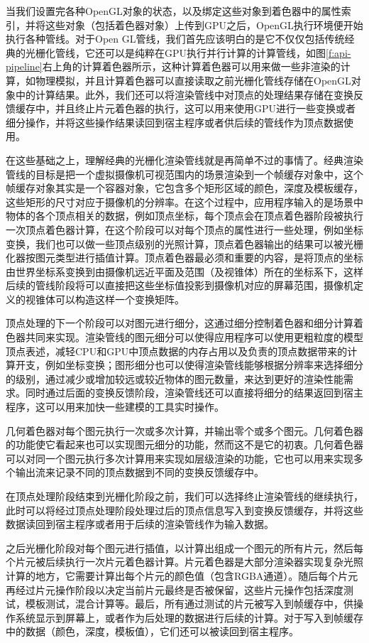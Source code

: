 当我们设置完各种OpenGL对象的状态，以及绑定这些对象到着色器中的属性索引，并将这些对象（包括着色器对象）上传到GPU之后，OpenGL执行环境便开始执行各种管线。对于Open GL管线，我们首先应该明白的是它不仅仅包括传统经典的光栅化管线，它还可以是纯粹在GPU执行并行计算的计算管线，如图\ref{f:api-pipeline}右上角的计算着色器所示，这种计算着色器可以用来做一些非渲染的计算，如物理模拟，并且计算着色器可以直接读取之前光栅化管线存储在OpenGL对象中的计算结果。此外，我们还可以将渲染管线中对顶点的处理结果存储在变换反馈缓存中，并且终止片元着色器的执行，这可以用来使用GPU进行一些变换或者细分操作，并将这些操作结果读回到宿主程序或者供后续的管线作为顶点数据使用。

在这些基础之上，理解经典的光栅化渲染管线就是再简单不过的事情了。经典渲染管线的目标是把一个虚拟摄像机可视范围内的场景渲染到一个帧缓存对象中，这个帧缓存对象其实是一个容器对象，它包含多个矩形区域的颜色，深度及模板缓存，这些矩形的尺寸对应于摄像机的分辨率。在这个过程中，应用程序输入的是场景中物体的各个顶点相关的数据，例如顶点坐标，每个顶点会在顶点着色器阶段被执行一次顶点着色器计算，在这个阶段可以对每个顶点的属性进行一些处理，例如坐标变换，我们也可以做一些顶点级别的光照计算，顶点着色器输出的结果可以被光栅化器按图元类型进行插值计算。顶点着色器最必须和重要的内容，是将顶点的坐标由世界坐标系变换到由摄像机远近平面及范围（及视锥体）所在的坐标系下，这样后续的管线阶段将可以直接把这些坐标值投影到摄像机对应的屏幕范围，摄像机定义的视锥体可以构造这样一个变换矩阵。

顶点处理的下一个阶段可以对图元进行细分，这通过细分控制着色器和细分计算着色器共同来实现。渲染管线的图元细分可以使得应用程序可以使用更粗粒度的模型顶点表述，减轻CPU和GPU中顶点数据的内存占用以及负责的顶点数据带来的计算开支，例如坐标变换；图形细分也可以使得渲染管线能够根据分辨率来选择细分的级别，通过减少或增加较远或较近物体的图元数量，来达到更好的渲染性能需求。同时通过后面的变换反馈阶段，渲染管线还可以直接将细分的结果返回到宿主程序，这可以用来加快一些建模的工具实时操作。

几何着色器对每个图元执行一次或多次计算，并输出零个或多个图元。几何着色器的功能使它看起来也可以实现图元细分的功能，然而这不是它的初衷。几何着色器可以对同一个图元执行多次计算用来实现如层级渲染的功能，它也可以用来实现多个输出流来记录不同的顶点数据到不同的变换反馈缓存中。

在顶点处理阶段结束到光栅化阶段之前，我们可以选择终止渲染管线的继续执行，此时可以将经过顶点处理阶段处理过后的顶点信息写入到变换反馈缓存，并将这些数据读回到宿主程序或者用于后续的渲染管线作为输入数据。

之后光栅化阶段对每个图元进行插值，以计算出组成一个图元的所有片元，然后每个片元被后续执行一次片元着色器计算。片元着色器是大部分渲染器实现复杂光照计算的地方，它需要计算出每个片元的颜色值（包含RGBA通道）。随后每个片元再经过片元操作阶段以决定当前片元最终是否被保留，这些片元操作包括深度测试，模板测试，混合计算等。最后，所有通过测试的片元被写入到帧缓存中，供操作系统显示到屏幕上，或者作为后处理的数据进行后续的计算。对于写入到帧缓存中的数据（颜色，深度，模板值），它们还可以被读回到宿主程序。

